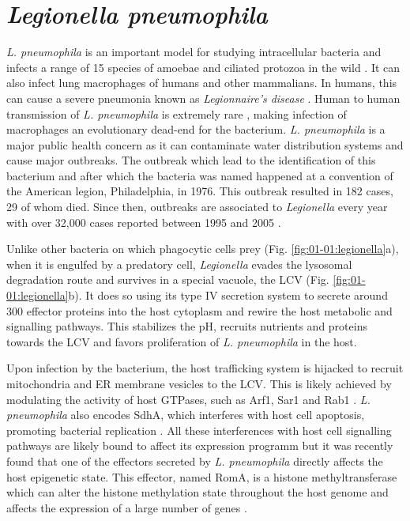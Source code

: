 \section{\textit{Legionella pneumophila}}

\textit{L. pneumophila} is an important model for studying intracellular bacteria and infects a range of 15 species of amoebae and ciliated protozoa in the wild \cite{Rowbotham1980}. It can also infect lung macrophages of humans and other mammalians. In humans, this can cause a severe pneumonia known as \textit{Legionnaire's disease} \cite{CentersforDiseaseControlandPrevention2018}. Human to human transmission of \textit{L. pneumophila} is extremely rare \cite{Correia2016}, making infection of macrophages an evolutionary dead-end for the bacterium. \textit{L. pneumophila} is a major public health concern as it can contaminate water distribution systems and cause major outbreaks. The outbreak which lead to the identification of this bacterium and after which the bacteria was named happened at a convention of the American legion, Philadelphia, in 1976. This outbreak resulted in 182 cases, 29 of whom died. Since then, outbreaks are associated to \textit{Legionella} every year with over 32,000 cases reported between 1995 and 2005 \cite{mcdade2008}.

Unlike other bacteria on which phagocytic cells prey (Fig. \ref{fig:01-01:legionella}a), when it is engulfed by a predatory cell, \textit{Legionella} evades the lysosomal degradation route and survives in a special vacuole, the \acrfull{LCV} (Fig. \ref{fig:01-01:legionella}b). It does so using its type IV secretion system to secrete around 300 effector proteins into the host cytoplasm and rewire the host metabolic and signalling pathways. This stabilizes the pH, recruits nutrients and proteins towards the \acrshort{LCV} and favors proliferation of \textit{L. pneumophila} in the host.

Upon infection by the bacterium, the host trafficking system is hijacked to recruit mitochondria and ER membrane vesicles to the LCV. This is likely achieved by modulating the activity of host GTPases, such as Arf1, Sar1 and Rab1 \cite{Isberg2009}. \textit{L. pneumophila} also encodes SdhA,  which interferes with host cell apoptosis, promoting bacterial replication \cite{Isberg2009}. All these interferences with host cell signalling pathways are likely bound to affect its expression programm but it was recently found that one of the effectors secreted by \textit{L. pneumophila} directly affects the host epigenetic state. This effector, named RomA, is a histone methyltransferase which can alter the histone methylation state throughout the host genome and affects the expression of a large number of genes \cite{Rolando2013}.

